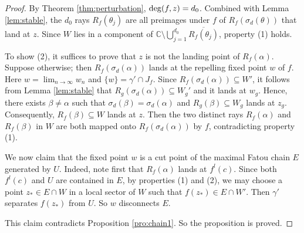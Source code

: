 \documentclass[a4paper,reqno,times, 11pt]{amsart}
\theoremstyle{remark}
\theoremstyle{plain}
\numberwithin{equation}{section}
\def\g{\gamma}
\def\C{\mbox{$\mathbb C$}}
\begin{document}
\begin{proof}
	By Theorem \ref{thm:perturbation}, ${\rm deg}(f,  z)=d_0$. Combined with Lemma \ref{lem:stable}, the $d_0$ rays $R_f(\theta_j)$ are all preimages under $f$ of $R_f(\sigma_d(\theta))$ that land at $z$. Since $W$ lies in a component of $\C\setminus\bigcup_{j=1}^{d_0}\overline{R_f(\theta_j)}$, property (1) holds.\vspace{2pt}
	
	To show (2), it suffices to prove that $z$ is not the landing point of $R_f(\alpha)$. Suppose otherwise; then $R_f(\sigma_d(\alpha))$ lands at the repelling fixed point $w$ of $f$. Here $w=\lim_{n\to\infty} w_n$ and $\{w\}=\gamma'\cap J_f$. Since $R_f(\sigma_d(\alpha))\subseteq W'$, it follows from Lemma \ref{lem:stable} that $R_g(\sigma_d(\alpha))\subseteq W_g'$ and  it lands at $w_g$. Hence, there exists $\beta\neq \alpha$ such that $\sigma_d(\beta)=\sigma_d(\alpha)$ and $R_g(\beta)\subseteq W_g$ lands at $z_g$.  Consequently, $R_f(\beta)\subseteq W$ lands at $z$.
	Then the two distinct rays $R_f(\alpha)$ and $R_f(\beta)$ in $W$  are both mapped onto $R_f(\sigma_d(\alpha))$ by $f$, contradicting property (1).\vspace{2pt}
	
	
	We now claim that the fixed point $w$ is a cut point of the maximal Fatou chain $E$ generated by $U$. Indeed,  note first that $R_f(\alpha)$ lands at $f^l(c)$. Since both $f^l(c)$ and $ U$ are contained in $E$, by properties (1) and (2), we may choose a point $z_*\in E\cap W$ in a local sector of $W$ such that $f(z_*)\in E\cap W'$. Then $\g'$ separates $f(z_*)$ from $ U$. So $w$ disconnects $E$.
	
	This claim contradicts Proposition \ref{pro:chain1}. So the  proposition is proved.
\end{proof}
\end{document}
